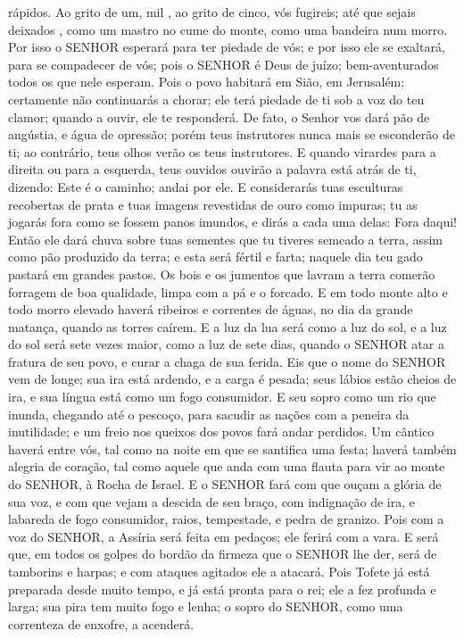 {{} rápidos.
  Ao grito de um, mil
{}, {} ao grito de cinco,
{} vós fugireis; até que sejais deixados
{}, como um mastro no cume do monte, como uma bandeira num morro.
  Por isso o SENHOR esperará para ter piedade de vós; e por isso ele se exaltará, para se compadecer de vós; pois o SENHOR é Deus de juízo; bem-aventurados todos os que nele esperam.
  Pois o povo habitará em Sião, em Jerusalém; certamente não continuarás a chorar; ele terá piedade de ti sob a voz do teu clamor; quando a ouvir, ele te responderá.
  De fato, o Senhor vos dará pão de angústia, e água de opressão; porém teus instrutores
 nunca mais se esconderão de ti; ao contrário, teus olhos verão os teus instrutores.
  E quando virardes para a direita ou para a esquerda, teus ouvidos ouvirão a palavra
{} está atrás de ti, dizendo: Este é o caminho; andai por ele.
  E considerarás tuas esculturas recobertas de prata e tuas imagens revestidas de ouro como impuras; tu as jogarás fora como se fossem panos imundos, e dirás a cada uma delas: Fora daqui!
  Então ele dará chuva sobre tuas sementes que tu tiveres semeado a terra, assim como pão produzido da terra; e esta será fértil e farta; naquele dia teu gado pastará em grandes pastos.
  Os bois e os jumentos que lavram a terra comerão forragem de boa qualidade, limpa com a pá e o forcado.
  E em todo monte alto e todo morro elevado haverá ribeiros e correntes de águas, no dia da grande matança, quando as torres caírem.
  E a luz da lua será como a luz do sol, e a luz do sol será sete vezes maior, como a luz de sete dias, quando o SENHOR atar a fratura de seu povo, e curar a chaga de sua ferida.
  Eis que o nome do SENHOR vem de longe; sua ira está ardendo, e a carga é pesada; seus lábios estão cheios de ira, e sua língua está como um fogo consumidor.
  E seu sopro como um rio que inunda, chegando até o pescoço, para sacudir as nações com a peneira da inutilidade; e um freio nos queixos dos povos
{} fará andar perdidos.
  Um cântico haverá entre vós, tal como na noite em que se santifica uma festa; haverá também alegria de coração, tal como aquele que anda com uma flauta para vir ao monte do SENHOR, à Rocha de Israel.
  E o SENHOR fará com que ouçam a glória de sua voz, e com que vejam a descida de seu braço, com indignação de ira, e labareda de fogo consumidor, raios, tempestade, e pedra de granizo.
  Pois com a voz do SENHOR, a Assíria será feita em pedaços; ele
{} ferirá com a vara.
  E será que, em todos os golpes
 do bordão da firmeza
 que o SENHOR lhe der, será
{} de tamborins e harpas; e com ataques agitados ele a atacará.
  Pois Tofete já está preparada desde muito tempo, e já está pronta para o rei; ele a fez profunda e larga; sua pira tem muito fogo e lenha; o sopro do SENHOR, como uma correnteza de enxofre, a acenderá.
\par }

